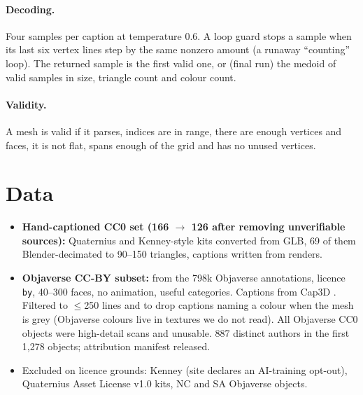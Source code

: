 \documentclass[11pt]{article}
\begin{document}
\paragraph{Decoding.} Four samples per caption at temperature 0.6. A loop guard stops a sample when its last six vertex lines step by the same nonzero amount
(a runaway ``counting'' loop). The returned sample is the first valid one, or (final run) the medoid of valid samples in size, triangle count and colour count.
\paragraph{Validity.} A mesh is valid if it parses, indices are in range, there are enough vertices and faces, it is not flat, spans enough of the grid and has no unused vertices.

\section{Data}
\begin{itemize}
\item \textbf{Hand-captioned CC0 set (166 $\to$ 126 after removing unverifiable sources):} Quaternius and Kenney-style kits converted from GLB, 69 of them Blender-decimated to 90--150 triangles, captions written from renders.
\item \textbf{Objaverse CC-BY subset:} from the 798k Objaverse annotations, licence \texttt{by}, 40--300 faces, no animation, useful categories. Captions from Cap3D \cite{cap3d}.
Filtered to $\le$250 lines and to drop captions naming a colour when the mesh is grey (Objaverse colours live in textures we do not read).
All Objaverse CC0 objects were high-detail scans and unusable. 887 distinct authors in the first 1,278 objects; attribution manifest released.
\item Excluded on licence grounds: Kenney (site declares an AI-training opt-out), Quaternius Asset License v1.0 kits, NC and SA Objaverse objects.
\end{itemize}
\end{document}
